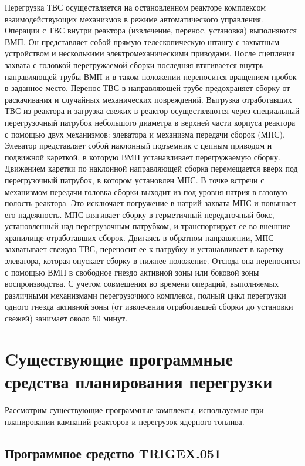 Перегрузка ТВС осуществляется на остановленном реакторе комплексом взаимодействующих механизмов в режиме автоматического управления.
Операции с ТВС внутри реактора (извлечение, перенос, установка) выполняются ВМП.
Он представляет собой прямую телескопическую штангу с захватным устройством и несколькими электромеханическими приводами.
После сцепления захвата с головкой перегружаемой сборки последняя втягивается внутрь направляющей трубы ВМП и в таком положении переносится вращением пробок в заданное место.
Перенос ТВС в направляющей трубе предохраняет сборку от раскачивания и случайных механических повреждений.
Выгрузка отработавших ТВС из реактора и загрузка свежих в реактор осуществляются через специальный перегрузочный патрубок небольшого диаметра в верхней части корпуса реактора с помощью двух механизмов: элеватора и механизма передачи сборок (МПС).
Элеватор представляет собой наклонный подъемник с цепным приводом и подвижной кареткой, в которую ВМП устанавливает перегружаемую сборку.
Движением каретки по наклонной направляющей сборка перемещается вверх под перегрузочный патрубок, в котором установлен МПС.
В точке встречи с механизмом передачи головка сборки выходит из-под уровня натрия в газовую полость реактора.
Это исключает погружение в натрий захвата МПС и повышает его надежность.
МПС втягивает сборку в герметичный передаточный бокс, установленный над перегрузочным патрубком, и транспортирует ее во внешние хранилище отработавших сборок.
Двигаясь в обратном направлении, МПС захватывает свежую ТВС, переносит ее к патрубку и устанавливает в каретку элеватора, которая опускает сборку в нижнее положение.
Отсюда она переносится с помощью ВМП в свободное гнездо активной зоны или боковой зоны воспроизводства. 
С учетом совмещения во времени операций, выполняемых различными механизмами перегрузочного комплекса, полный цикл перегрузки одного гнезда активной зоны (от извлечения отработавшей сборки до установки свежей) занимает около 50 минут.
\cite{BH}


\section{Cуществующие программные средства планирования перегрузки}

Рассмотрим существующие программные комплексы, используемые при планировании кампаний реакторов и перегрузок ядерного топлива.

\subsection{Программное средство TRIGEX.051}

